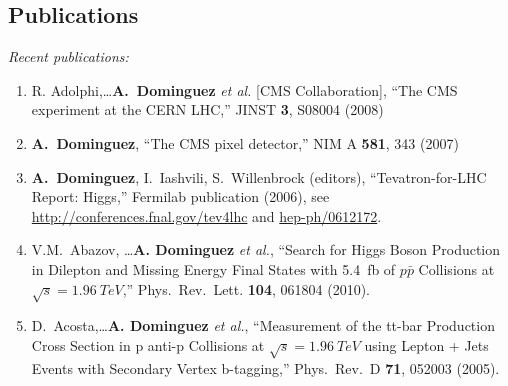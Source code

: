 \documentclass[11pt]{article}
\begin{document}
\subsection*{Publications}
\textit{Recent publications:}
\begin{enumerate}
\item R. Adolphi,\ldots\textbf{A.~Dominguez}  \textit{et al.} [CMS Collaboration], ``The CMS
  experiment at the CERN LHC,'' JINST \textbf{3}, S08004 (2008)
\item \textbf{A.~Dominguez}, ``The CMS pixel detector,'' NIM A
  \textbf{581}, 343 (2007)
\item \textbf{A.~Dominguez}, I.~Iashvili, S.~Willenbrock (editors),
  ``Tevatron-for-LHC Report: Higgs,'' Fermilab publication (2006), see
  \url{http://conferences.fnal.gov/tev4lhc} and \href{http://arxiv.org/abs/hep-ph/0612172}{hep-ph/0612172}.
\item V.M.~Abazov, \ldots\textbf{A. Dominguez} \textit{et al.},
  ``Search for Higgs Boson Production in Dilepton and Missing Energy
  Final States with 5.4~fb of $p\bar{p}$ Collisions at
  $\sqrt{s}=1.96~TeV$,'' Phys.\ Rev.\ Lett. \textbf{104}, 061804 (2010).
\item D.~Acosta,\ldots\textbf{A. Dominguez} \textit{et al.}, %
  ``Measurement of the tt-bar Production Cross Section in p anti-p
  Collisions at $\sqrt{s}=1.96~TeV$ using Lepton + Jets Events with
  Secondary Vertex b-tagging,'' Phys.\ Rev.\ D {\bf 71}, 052003 (2005).

\end{enumerate}




\end{document}
